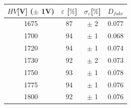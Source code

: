    \begin{tabular}{cccc}
    \toprule
    $HV$[V] ($\pm$ 1V)& $\varepsilon$ [$\%$] & $\sigma_{\varepsilon}$[$\%$] & $D_{fake}$ \\
    \midrule
    1675 & 87 & $\pm$ 2 & 0.077 \\
    1700 & 94 & $\pm$ 1 & 0.068 \\
    1720 & 94 & $\pm$ 1 & 0.074 \\
    1730 & 92 & $\pm$ 2 & 0.073 \\
    1750 & 93 & $\pm$ 1 & 0.078 \\
    1775 & 94 & $\pm$ 1 & 0.076 \\
    1800 & 92 & $\pm$ 1 & 0.076 \\
    \bottomrule
    \end{tabular}